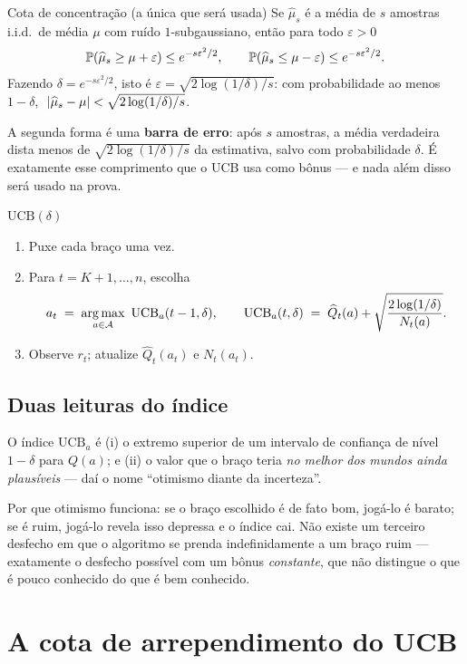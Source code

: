 \documentclass[11pt]{article}
\newcommand{\Qh}{\widehat{Q}}
\newcommand{\muh}{\widehat{\mu}}
\newcommand{\ucb}{\mathrm{UCB}}
\begin{document}
\begin{teobox}{Cota de concentração (a única que será usada)}
Se $\muh_s$ é a média de $s$ amostras i.i.d.\ de média $\mu$ com ruído
$1$-subgaussiano, então para todo $\varepsilon>0$
\[
  \Prob(\muh_s \ge \mu + \varepsilon) \le e^{-s\varepsilon^{2}/2},
  \qquad
  \Prob(\muh_s \le \mu - \varepsilon) \le e^{-s\varepsilon^{2}/2}.
\]
Fazendo $\delta = e^{-s\varepsilon^2/2}$, isto é
$\varepsilon = \sqrt{2\log(1/\delta)/s}$: com probabilidade ao menos
$1-\delta$, $\;\abs{\muh_s - \mu} < \sqrt{2\log(1/\delta)/s}$.
\end{teobox}

A segunda forma é uma \textbf{barra de erro}: após $s$ amostras, a média
verdadeira dista menos de $\sqrt{2\log(1/\delta)/s}$ da estimativa, salvo com
probabilidade $\delta$. É exatamente esse comprimento que o UCB usa como bônus
--- e nada além disso será usado na prova.

\begin{algbox}{$\ucb(\delta)$}
\begin{enumerate}[leftmargin=1.6em]
  \item Puxe cada braço uma vez.
  \item Para $t = K+1,\dots,n$, escolha
  \[
    a_t \;=\; \argmax_{a\in\gA}\ \ucb_a(t-1,\delta),
    \qquad
    \ucb_a(t,\delta) \;=\; \Qh_{t}(a) + \sqrt{\frac{2\log(1/\delta)}{N_{t}(a)}} .
  \]
  \item Observe $r_t$; atualize $\Qh_t(a_t)$ e $N_t(a_t)$.
\end{enumerate}
\end{algbox}

\subsection*{Duas leituras do índice}

O índice $\ucb_a$ é (i) o extremo superior de um intervalo de confiança de
nível $1-\delta$ para $Q(a)$; e (ii) o valor que o braço teria \emph{no melhor
dos mundos ainda plausíveis} --- daí o nome ``otimismo diante da incerteza''.

Por que otimismo funciona: se o braço escolhido é de fato bom, jogá-lo é
barato; se é ruim, jogá-lo revela isso depressa e o índice cai. Não existe um
terceiro desfecho em que o algoritmo se prenda indefinidamente a um braço ruim
--- exatamente o desfecho possível com um bônus \emph{constante}, que não
distingue o que é pouco conhecido do que é bem conhecido.

\section{A cota de arrependimento do UCB}
\label{sec:prova}
\end{document}
